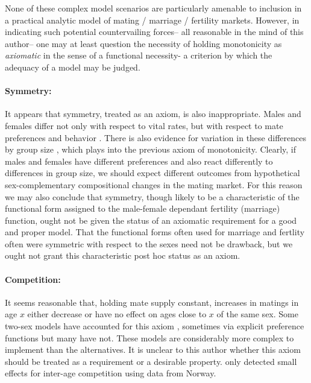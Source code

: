  None of these complex model scenarios are particularly amenable to inclusion in
 a practical analytic model of mating / marriage / fertility markets. However,
 in indicating such potential countervailing forces-- all reasonable in the mind
 of this author-- one may at least question the necessity of holding
 monotonicity as \textit{axiomatic} in the sense of a functional necessity- a
 criterion by which the adequacy of a model may be judged. 

\paragraph{Symmetry:} It appears that symmetry, treated as an axiom, is also
inappropriate. Males and females differ not only with respect to vital rates,
but with respect to mate preferences and behavior \citep{buss1989sex}. There is
also evidence for variation in these differences by group size
\citep{fisman2006gender}, which plays into the previous axiom of monotonicity.
Clearly, if males and females have different preferences and also react
differently to differences in group size, we should expect different outcomes
from hypothetical sex-complementary compositional changes in the mating market.
For this reason we may also conclude that symmetry, though likely to be a
characteristic of the functional form assigned to the male-female
dependant fertility (marriage) function, ought not be given the status of an
axiomatic requirement for a good and proper model. That the functional forms
often used for marriage and fertlity often were symmetric with respect to the
sexes need not be drawback, but we ought not grant this characteristic post hoc
status as an axiom.

\paragraph{Competition:} It seems reasonable that, holding mate supply constant,
increases in matings in age $x$ either decrease or have no effect on ages
close to $x$ of the same sex. Some two-sex models have accounted for this axiom
\citep{henry1972nuptiality, mc1975models, choo2006estimating}, sometimes via
explicit preference functions \citep{parlett1972can, pollard1993interaction} but
many have not. These models are considerably more complex to implement than the 
alternatives. It is unclear to this author whether this axiom should be treated
as a requirement or a desirable property. \citet{keilman1999female} only
detected small effects for inter-age competition using data from Norway.


